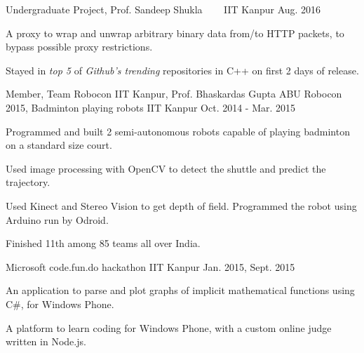 \begin{cventries}
  \cventry
  {Undergraduate Project, Prof. Sandeep Shukla}
  {\href{https://github.com/sakshamsharma/HTTP-Over-Protocol}{}
    \ \ \ }
  {IIT Kanpur}
  {Aug. 2016}
  {
    \begin{cvitems}
    \item A proxy to wrap and unwrap arbitrary binary data from/to
      HTTP packets, to bypass possible proxy restrictions.
    \item Stayed in \textit{top 5} of \textit{Github's trending}
      repositories in C++ on first 2 days of release.
    \end{cvitems}
  }

  \cventry
  {Member, Team Robocon IIT Kanpur, Prof. Bhaskardas Gupta}
  {ABU Robocon 2015, Badminton playing robots}
  {IIT Kanpur}
  {Oct. 2014 - Mar. 2015}
  {
    \begin{cvitems}
    \item Programmed and built 2 semi-autonomous robots
      capable of playing badminton on a standard size court.
    \item Used image processing with OpenCV to detect the shuttle
      and predict the trajectory.
    \item Used Kinect and Stereo Vision to get depth of
      field. Programmed the robot using Arduino run by Odroid.
    \item Finished 11th among 85 teams all over India.
    \end{cvitems}
  }

  {Microsoft code.fun.do hackathon}
  {IIT Kanpur}
  {Jan. 2015, Sept. 2015}
  {
    \begin{cvitems}
    \item An application to parse and plot graphs of implicit
      mathematical functions using C\#, for Windows Phone.
    \item A platform to learn coding for Windows Phone, with a
      custom online judge written in Node.js.
    \end{cvitems}
  }

\end{cventries}

